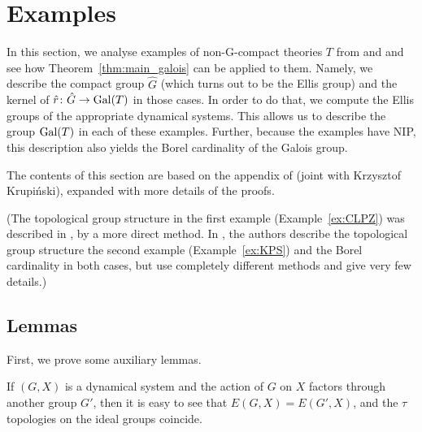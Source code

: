 	
	\section{Examples}
	\label{sec:examples}
	
	In this section, we analyse examples of non-G-compact theories $T$ from \cite{CLPZ01} and \cite{KPS13} and see how Theorem~\ref{thm:main_galois} can be applied to them. Namely, we describe the compact group $\hat G$ (which turns out to be the Ellis group) and the kernel of $\hat r\colon \hat G\to \operatorname{{Gal}}(T)$ in those cases. In order to do that, we compute the Ellis groups of the appropriate dynamical systems. This allows us to describe the group $\operatorname{{Gal}}(T)$ in each of these examples. Further, because the examples have NIP, this description also yields the Borel cardinality of the Galois group.
	
	The contents of this section are based on the appendix of \cite{KR18} (joint with Krzysztof Krupiński), expanded with more details of the proofs.
	
	(The topological group structure in the first example (Example~\ref{ex:CLPZ}) was described in \cite{Zie02}, by a more direct method. In \cite{KPS13}, the authors describe the topological group structure the second example (Example~\ref{ex:KPS}) and the Borel cardinality in both cases, but use completely different methods and give very few details.)
	
	\subsection*{Lemmas}
	First, we prove some auxiliary lemmas.
	
	\begin{rem}
		\label{rem:action_factors}
		If $(G,X)$ is a dynamical system and the action of $G$ on $X$ factors through another group $G'$, then it is easy to see that $E(G,X)=E(G',X)$, and the $\tau$ topologies on the ideal groups coincide.\xqed{\lozenge}
	\end{rem}
	

